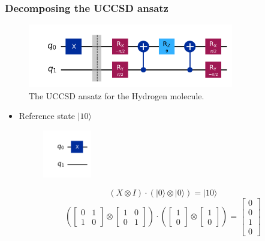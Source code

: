 \documentclass{article}
\begin{document}
\subsubsection*{Decomposing the UCCSD ansatz}
\begin{figure}[h]
    \centering
    \includegraphics[width=0.8\textwidth, height=0.2\textheight]{Circ.png}
    \caption{The UCCSD ansatz for the Hydrogen molecule.}
    \label{fig:yourlabel}
\end{figure}
\begin{itemize}
    \item Reference state \(|10 \rangle\)
    \begin{figure}[H]
        \centering
        \includegraphics[width=0.2\textwidth, height=0.2\textheight]{ref.png}
    \end{figure}
    \[
    \left( X \otimes I\right) \cdot \left( |0 \rangle \otimes | 0 \rangle \right) = |10 \rangle 
    \]
    \[
    \left(
    \begin{bmatrix}
        0 & 1\\
        1 & 0
    \end{bmatrix}
    \otimes 
    \begin{bmatrix}
        1 & 0\\
        0 & 1
    \end{bmatrix}
    \right)
    \cdot
    \left(
    \begin{bmatrix}
        1\\
        0
    \end{bmatrix}
    \otimes
    \begin{bmatrix}
        1\\
        0
    \end{bmatrix}
    \right)
    =
    \begin{bmatrix}
        0\\
        0\\
        1\\
        0
    \end{bmatrix}
    \]


\end{itemize}
\end{document}
